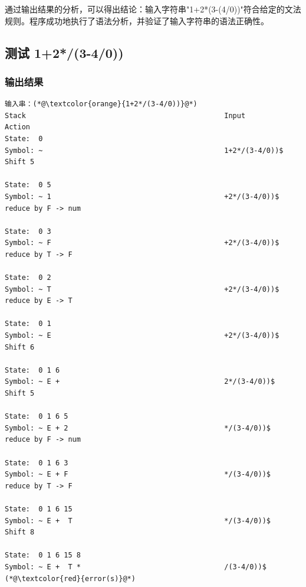 \documentclass[lang=cn,11pt,a4paper]{elegantpaper}
\begin{document}
通过输出结果的分析，可以得出结论：输入字符串"1+2*(3-(4/0))"符合给定的文法规则。程序成功地执行了语法分析，并验证了输入字符串的语法正确性。

\subsection{测试 1+2*/(3-4/0))}

\subsubsection{输出结果}

\begin{lstlisting}[language=text]
输入串：(*@\textcolor{orange}{1+2*/(3-4/0))}@*)
Stack                                              	Input                          	Action
State:  0                                         
Symbol: ~                                          	1+2*/(3-4/0))$                	Shift 5

State:  0 5                                       
Symbol: ~ 1                                        	+2*/(3-4/0))$                 	reduce by F -> num

State:  0 3                                       
Symbol: ~ F                                        	+2*/(3-4/0))$                 	reduce by T -> F

State:  0 2                                       
Symbol: ~ T                                        	+2*/(3-4/0))$                 	reduce by E -> T

State:  0 1                                       
Symbol: ~ E                                        	+2*/(3-4/0))$                 	Shift 6

State:  0 1 6                                     
Symbol: ~ E +                                      	2*/(3-4/0))$                  	Shift 5

State:  0 1 6 5                                   
Symbol: ~ E + 2                                    	*/(3-4/0))$                   	reduce by F -> num

State:  0 1 6 3                                   
Symbol: ~ E + F                                    	*/(3-4/0))$                   	reduce by T -> F

State:  0 1 6 15                                  
Symbol: ~ E +  T                                   	*/(3-4/0))$                   	Shift 8

State:  0 1 6 15 8                                
Symbol: ~ E +  T *                                 	/(3-4/0))$                    	 (*@\textcolor{red}{error(s)}@*) 
\end{lstlisting}
\end{document}
